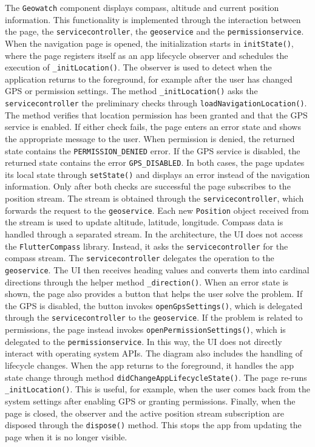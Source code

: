 The \texttt{Geowatch} component displays compass, altitude and current position information. This functionality is implemented through the interaction between the page, the \texttt{servicecontroller}, the \texttt{geoservice} and the \texttt{permissionservice}.
When the navigation page is opened, the initialization starts in \texttt{initState()}, where the page registers itself as an app lifecycle observer and schedules the execution of \texttt{\_initLocation()}. The observer is used to detect when the application returns to the foreground, for example after the user has changed GPS or permission settings.
The method \texttt{\_initLocation()} asks the \texttt{servicecontroller} the preliminary checks through \texttt{loadNavigationLocation()}. 
The method verifies that location permission has been granted and that the GPS service is enabled. If either check fails, the page enters an error state and shows the appropriate message to the user.
When permission is denied, the returned state contains the  \texttt{PERMISSION\_DENIED} error. If the GPS service is disabled, the returned state contains the error \texttt{GPS\_DISABLED}. In both cases, the page updates its local state through \texttt{setState()} and displays an error instead of the navigation information.
Only after both checks are successful the page subscribes to the position stream. The stream is obtained through the  \texttt{servicecontroller}, which forwards the request to the \texttt{geoservice}. Each new \texttt{Position} object received from the stream is used to update altitude, latitude, longitude.
Compass data is handled through a separated stream. In the architecture, the UI does not access the \texttt{FlutterCompass} library. Instead, it asks the \texttt{servicecontroller} for the compass stream. The \texttt{servicecontroller} delegates the operation to the \texttt{geoservice}. The UI then receives heading values and converts them into cardinal directions through the helper method \texttt{\_direction()}.
When an error state is shown, the page also provides a button that helps the user solve the problem. If the GPS is disabled, the button invokes \texttt{openGpsSettings()}, which is delegated through the \texttt{servicecontroller} to the \texttt{geoservice}. If the problem is related to permissions, the page instead invokes \texttt{openPermissionSettings()}, which is delegated to the \texttt{permissionservice}. In this way, the UI does not directly interact with operating system APIs.
The diagram also includes the handling of lifecycle changes. When the app returns to the foreground, it handles the app state change through method \texttt{didChangeAppLifecycleState()}. The page re-runs \texttt{\_initLocation()}. This is useful, for example, when the user comes back from the system settings after enabling GPS or granting permissions.
Finally, when the page is closed, the observer and the active position stream subscription are disposed through the \texttt{dispose()} method. This stops the app from updating the page when it is no longer visible.

